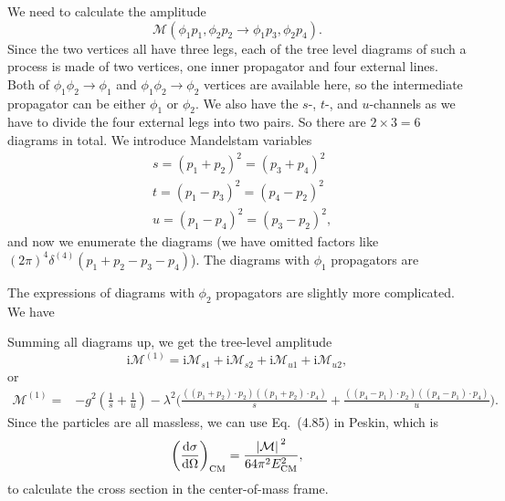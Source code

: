 \documentclass[hyperref, a4paper]{article}
\newcommand*{\ii}{\mathrm{i}}
\begin{document}
We need to calculate the amplitude
\[
    \mathcal{M}(\phi_1 p_1, \phi_2 p_2 \to \phi_1 p_3, \phi_2 p_4).
\]
Since the two vertices all have three legs, each of the tree level diagrams of such a process is made of two vertices, one inner propagator and four external lines.
Both of $\phi_1 \phi_2 \to \phi_1$ and $\phi_1 \phi_2 \to \phi_2$ vertices are available here, 
so the intermediate propagator can be either $\phi_1$ or $\phi_2$.
We also have the $s$-, $t$-, and $u$-channels as we have to divide the four external legs into two pairs.
So there are $2 \times 3 = 6$ diagrams in total. 
We introduce Mandelstam variables
\begin{equation}
    \begin{aligned}
        &s=\left(p_{1}+p_{2}\right)^{2}=\left(p_{3}+p_{4}\right)^{2} \\
        &t=\left(p_{1}-p_{3}\right)^{2}=\left(p_{4}-p_{2}\right)^{2} \\
        &u=\left(p_{1}-p_{4}\right)^{2}=\left(p_{3}-p_{2}\right)^{2},
        \end{aligned}
\end{equation} 
and now we enumerate the diagrams (we have omitted factors like $(2\pi)^4 \delta^{(4)}(p_1 + p_2 - p_3 - p_4)$).
The diagrams with $\phi_1$ propagators are 

%

The expressions of diagrams with $\phi_2$ propagators are slightly more complicated. We have 

%

Summing all diagrams up, we get the tree-level amplitude
\[
    \ii \mathcal{M}^{(1)} = \ii \mathcal{M}_{s1} + \ii \mathcal{M}_{s2} + \ii \mathcal{M}_{u1} + \ii \mathcal{M}_{u2} ,
\]
or 
\begin{equation}
    \begin{aligned}
        \mathcal{M}^{(1)} = &- g^2 \left( \frac{1}{s} + \frac{1}{u}  \right) - \lambda^2 \Biggl( \frac{ ((p_1 + p_2) \cdot p_2)((p_1 + p_2) \cdot p_4)}{s } + \frac{ ((p_4 - p_1) \cdot p_2)((p_4 - p_1) \cdot p_4)}{u } \Biggr).
    \end{aligned}
\end{equation}
Since the particles are all massless, we can use Eq.~(4.85) in Peskin, which is 
\begin{equation}
    \left(\dv{\sigma}{\Omega}\right)_\text{CM} = \frac{\abs*{\mathcal{M}}^2}{64 \pi^2 E_\text{CM}^2},  
\end{equation}
to calculate the cross section in the center-of-mass frame.
\end{document}
